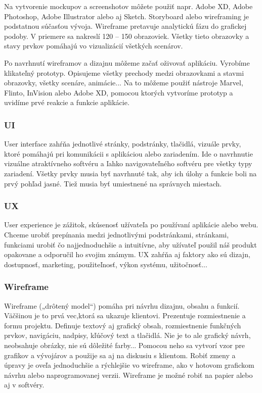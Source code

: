 \documentclass[10pt,twoside,slovak,a4paper]{article}
\begin{document}
Na vytvorenie mockupov a screenshotov môžete použiť napr. Adobe XD, Adobe Photoshop, Adobe Illustrator alebo aj Sketch. Storyboard alebo wireframing je podstatnou súčasťou vývoja. Wireframe pretavuje analytickú fázu do grafickej podoby. V priemere sa nakreslí 120 – 150 obrazoviek. Všetky tieto obrazovky a stavy prvkov pomáhajú vo vizualizácií všetkých scenárov.

Po navrhnutí wireframov a dizajnu môžeme začať oživovať aplikáciu. Vyrobíme klikateľný prototyp. Opisujeme všetky prechody medzi obrazovkami a stavmi obrazovky, všetky scenáre, animácie... Na to môžeme použiť nástroje Marvel, Flinto, InVision alebo Adobe XD, pomocou ktorých vytvoríme prototyp a uvidíme prvé reakcie a funkcie aplikácie.


\subsubsection{UI}
\quad User interface zahŕňa jednotlivé stránky, podstránky, tlačidlá, vizuále prvky, ktoré pomáhajú pri komunikácii s aplikáciou alebo zariadením. Ide o navrhnutie vizuálne atraktívneho softvéru a ľahko navigovateľného softvéru pre všetky typy zariadení. Všetky prvky musia byť navrhnuté tak, aby ich úlohy a funkcie boli na prvý pohľad jasné. Tiež musia byť umiestnené na správnych miestach.


\subsubsection{UX}
\quad User experience je zážitok, skúsenosť užívateľa po používaní aplikácie alebo webu. Chceme urobiť prepínania medzi jednotlivými podstránkami, stránkami, funkciami urobiť čo najjednoduchšie a intuitívne, aby užívateľ použil náš produkt opakovane a odporučil ho svojim známym. UX zahŕňa aj faktory ako sú dizajn, dostupnosť, marketing, použiteľnosť, výkon systému, užitočnosť...


\subsubsection{Wireframe}
\quad Wireframe („drôtený model“) pomáha pri návrhu dizajnu, obsahu a funkcií. Väčšinou je to prvá vec,ktorá sa ukazuje klientovi. Prezentuje rozmiestnenie a formu projektu. Definuje textový aj grafický obsah, rozmiestnenie funkčných prvkov, navigáciu, nadpisy, kľúčový text a tlačidlá. Nie je to ale grafický návrh, neobsahuje obrázky, nie sú dôležité farby... Pomocou neho sa vytvorí vzor pre grafikov a vývojárov a použije sa aj na diskusiu s klientom. Robiť zmeny a úpravy je oveľa jednoduchšie a rýchlejšie vo wireframe, ako v hotovom grafickom návrhu alebo naprogramovanej verzii. Wireframe je možné robiť na papier alebo aj v softvéry.
\end{document}
